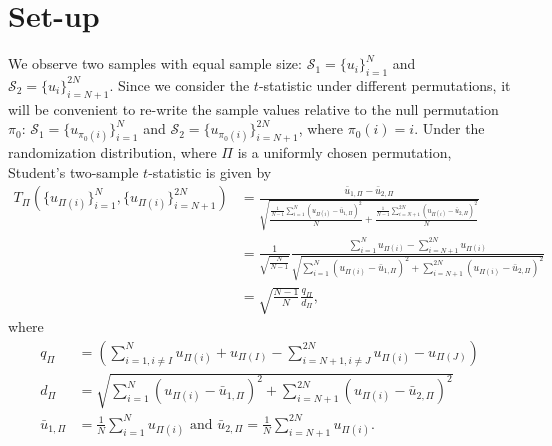 \section{Set-up}
We observe two samples with equal sample size: $\mathcal{S}_1 = \{u_i\}_{i=1}^N$
and $\mathcal{S}_2 = \{u_i\}_{i=N+1}^{2N}$.  Since we consider the $t$-statistic
under different permutations, it will be convenient to re-write the
sample values relative to the null permutation $\pi_0$: $\mathcal{S}_1 =
\{u_{\pi_0(i)}\}_{i=1}^N$ and $\mathcal{S}_2 = \{u_{\pi_0(i)}\}_{i=N+1}^{2N}$,
where $\pi_0(i) = i$.  Under the randomization distribution, where
$\Pi$ is a uniformly chosen permutation, Student's two-sample
$t$-statistic is given by
\begin{align*}
T_{\Pi}(\{u_{\Pi(i)}\}_{i=1}^N, \{u_{\Pi(i)}\}_{i=N+1}^{2N})
&= \frac{\bar{u}_{1,\Pi} - \bar{u}_{2,\Pi}}{\sqrt{\frac{\frac{1}{N-1}
      \sum_{i=1}^N(u_{\Pi(i)} - \bar{u}_{1,\Pi})^2}{N} + \frac{\frac{1}{N-1}
      \sum_{i=N+1}^{2N}(u_{\Pi(i)} - \bar{u}_{2,\Pi})^2}{N}}} \\
&= \frac{1}{\sqrt{\frac{N}{N-1}}} \frac{\sum_{i=1}^N u_{\Pi(i)} -
  \sum_{i=N+1}^{2N}u_{\Pi(i)}}{\sqrt{\sum_{i=1}^N(u_{\Pi(i)} -
    \bar{u}_{1,\Pi})^2 + \sum_{i=N+1}^{2N}(u_{\Pi(i)} - \bar{u}_{2,\Pi})^2}} \\
&= \sqrt{\frac{N-1}{N}}\frac{q_\Pi}{d_\Pi},
\end{align*}
where
\begin{align*}
  q_\Pi &= \left (\sum_{i=1, i\neq I}^N u_{\Pi(i)} + u_{\Pi(I)} -
    \sum_{i=N+1, i\neq J}^{2N}u_{\Pi(i)} - u_{\Pi(J)}\right ) \\
  d_\Pi &= \sqrt{\sum_{i=1}^N(u_{\Pi(i)} - \bar{u}_{1,\Pi})^2 +
    \sum_{i=N+1}^{2N}(u_{\Pi(i)} - \bar{u}_{2,\Pi})^2} \\
  \bar{u}_{1,\Pi} &= \frac{1}{N} \sum_{i=1}^N u_{\Pi(i)} \text{ and }
  \bar{u}_{2,\Pi} = \frac{1}{N} \sum_{i=N+1}^{2N} u_{\Pi(i)}.
\end{align*}

